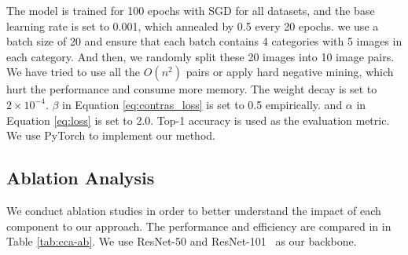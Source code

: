 \documentclass[letterpaper]{article} \usepackage{aaai20}  \usepackage{times}  \usepackage{helvet} \usepackage{courier}  \usepackage[hyphens]{url}  \usepackage{graphicx} \urlstyle{rm} \def\UrlFont{\rm}  \usepackage{graphicx}  \frenchspacing  \setlength{\pdfpagewidth}{8.5in}  \setlength{\pdfpageheight}{11in}  \usepackage{amsmath,amssymb}
\begin{document}
The model is trained for 100 epochs with SGD for all datasets, and the base learning rate is set to 0.001, which annealed by 0.5 every 20 epochs.
we use a batch size of 20 and ensure that each batch contains 4 categories with 5 images in each category. And then, we randomly split
these 20 images into 10 image pairs. We have tried to use
all the $O(n^2)$ pairs or apply hard negative mining, which
hurt the performance and consume more memory.
The weight decay is set to $2 \times 10^{-4}$. $\beta$ in Equation \ref{eq:contras_loss} is set to 0.5 empirically. and $\alpha$ in Equation \ref{eq:loss} is set to 2.0. Top-1 accuracy is used as the evaluation metric. We use PyTorch to implement our method.

\subsection{Ablation Analysis}
\label{sec:ablation}

We conduct ablation studies in order to better understand the impact of each component to our approach.
The performance and efficiency are compared in in Table \ref{tab:cca-ab}.
We use ResNet-50 and ResNet-101~\cite{DBLP:conf/cvpr/HeZRS16} as our backbone.


\begin{table}
\small
\begin{center}
\end{center}
\caption{Ablation studies of our network on CUB-200-2011. CIN consists of SCI and CCI. Time unit is ms.}
\label{tab:cca-ab}
\end{table}
\end{document}
